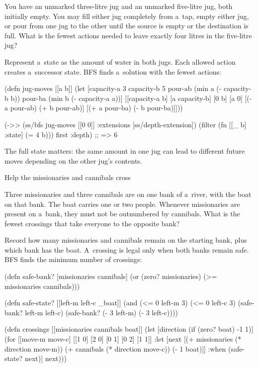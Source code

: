 { You have an unmarked three-litre jug and an unmarked
five-litre jug, both initially empty. You may fill either jug completely
from a~tap, empty either jug, or pour from one jug to the other until the
source is empty or the destination is full. What is the fewest actions
needed to leave exactly four litres in the five-litre jug?

\smallskip
{} Represent a~state as the amount of water in both
jugs. Each allowed action creates a~successor state. BFS finds a~solution
with the fewest actions:

\begtt {}
(defn jug-moves [[a b]]
  (let [capacity-a 3 capacity-b 5
        pour-ab (min a (- capacity-b b))
        pour-ba (min b (- capacity-a a))]
    [[capacity-a b] [a capacity-b] [0 b] [a 0]
     [(- a pour-ab) (+ b pour-ab)]
     [(+ a pour-ba) (- b pour-ba)]]))

(->> (ss/bfs jug-moves [[0 0]]
                 {:extensions [ss/depth-extension]})
     (filter (fn [{[_ b] :state}] (= 4 b)))
     first
     :depth)
;; => 6
\endtt

The full state matters: the same amount in one jug can lead to different
future moves depending on the other jug's contents.

\secc Help the missionaries and cannibals cross

 Three missionaries and three cannibals are on one
bank of a~river, with the boat on that bank. The boat carries one or two
people. Whenever missionaries are present on a~bank, they must not be
outnumbered by cannibals. What is
the fewest crossings that take everyone to the opposite bank?

\smallskip
{} Record how many missionaries and cannibals remain
on the starting bank, plus which bank has the boat. A~crossing is legal only
when both banks remain safe. BFS finds the minimum number of crossings:

\begtt {}
(defn safe-bank? [missionaries cannibals]
  (or (zero? missionaries)
      (>= missionaries cannibals)))

(defn safe-state? [[left-m left-c _boat]]
  (and (<= 0 left-m 3)
       (<= 0 left-c 3)
       (safe-bank? left-m left-c)
       (safe-bank? (- 3 left-m) (- 3 left-c))))

(defn crossings [[missionaries cannibals boat]]
  (let [direction (if (zero? boat) -1 1)]
    (for [[move-m move-c] [[1 0] [2 0] [0 1] [0 2] [1 1]]
          :let [next [(+ missionaries (* direction move-m))
                      (+ cannibals (* direction move-c))
                      (- 1 boat)]]
          :when (safe-state? next)]
      next)))

}
